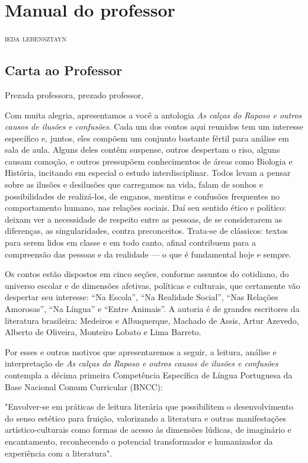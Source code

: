 \part{Manual do professor}

\begin{flushright}
\textsc{ieda lebensztayn}
\end{flushright}

\chapter{Carta ao Professor}

Prezada professora, prezado professor,

Com muita alegria, apresentamos a você a antologia \emph{As calças do
Raposo e outros causos de ilusões e confusões}. Cada um dos contos aqui
reunidos tem um interesse específico e, juntos, eles compõem um conjunto
bastante fértil para análise em sala de aula. Alguns deles contêm
suspense, outros despertam o riso, alguns causam comoção, e outros
pressupõem conhecimentos de áreas como Biologia e História, incitando em
especial o estudo interdisciplinar. Todos levam a pensar sobre as
ilusões e desilusões que carregamos na vida, falam de sonhos e
possibilidades de realizá-los, de enganos, mentiras e confusões
frequentes no comportamento humano, nas relações sociais. Daí seu
sentido ético e político: deixam ver a necessidade de respeito entre as
pessoas, de se considerarem as diferenças, as singularidades, contra
preconceitos. Trata-se de clássicos: textos para serem lidos em classe e
em todo canto, afinal contribuem para a compreensão das pessoas e da
realidade --- o que é fundamental hoje e sempre.

Os contos estão dispostos em cinco seções, conforme assuntos do
cotidiano, do universo escolar e de dimensões afetivas, políticas e
culturais, que certamente vão despertar seu interesse: ``Na Escola'',
``Na Realidade Social'', ``Nas Relações Amorosas'', ``Na Língua'' e
``Entre Animais''. A autoria é de grandes escritores da literatura
brasileira: Medeiros e Albuquerque, Machado de Assis, Artur Azevedo,
Alberto de Oliveira, Monteiro Lobato e Lima Barreto.

Por esses e outros motivos que apresentaremos a seguir, a leitura, análise e interpretação de \emph{As calças do
Raposo e outros causos de ilusões e confusões} contempla a décima primeira Competência Específica de Língua Portuguesa da Base Nacional Comum Curricular (BNCC): 

"Envolver-se em práticas de leitura literária que possibilitem o desenvolvimento do senso estético para fruição, valorizando a literatura e outras manifestações artístico-culturais como formas de acesso às dimensões lúdicas, de imaginário e encantamento, reconhecendo o potencial transformador e humanizador da experiência com a literatura". 

